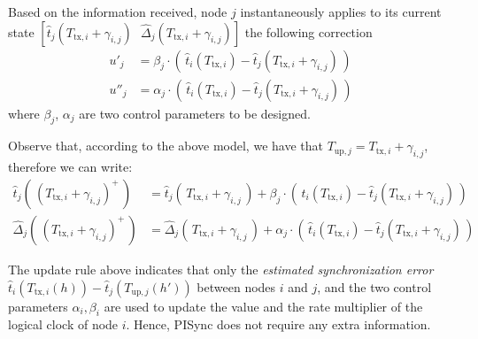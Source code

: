 \documentclass[english,a4paper,10pt,final]{article}
\numberwithin{equation}{section}
\numberwithin{figure}{section}
\begin{document}
Based on the information received, node $j$ instantaneously applies to its current state $[\hat{t}_j(T_{\mathrm{tx},i}+\gamma_{i,j})\,\,\,\,  \hat{\Delta}_j(T_{\mathrm{tx},i}+\gamma_{i,j})]$ the following correction
\begin{align}\label{eq:control-u}
u'_j &=   \beta_j \cdot \left(\, \hat{t}_i(T_{\mathrm{tx},i})-\hat{t}_j \left(T_{\mathrm{tx},i}+\gamma_{i,j}\right)\,\right)\nonumber\\
u''_j &=   \alpha_j \cdot \left(\, \hat{t}_i(T_{\mathrm{tx},i})-\hat{t}_j \left(T_{\mathrm{tx},i}+\gamma_{i,j}\right)\,\right)
\end{align}
where $\beta_j$, $\alpha_j$ are two control parameters to be designed.

Observe that, according to the above model, we have that $T_{\mathrm{up},j}=T_{\mathrm{tx},i}+\gamma_{i,j}$, therefore we can write:
\begin{align}
  \label{eq:Update_i1}
  \hat{t}_j\left(\,\left(T_{\mathrm{tx},i}+\gamma_{i,j}\right)^+\,\right) &= \hat{t}_j\left(\,T_{\mathrm{tx},i}+\gamma_{i,j}\,\right)+ \beta_j \cdot \left(\, \hat{t}_i(T_{\mathrm{tx},i})-\hat{t}_j \left(T_{\mathrm{tx},i}+\gamma_{i,j}\right)\,\right)\nonumber\\
\hat{\Delta}_j\left(\,\left(T_{\mathrm{tx},i}+\gamma_{i,j}\right)^+\,\right) & = \hat{\Delta}_j\left(\,T_{\mathrm{tx},i}+\gamma_{i,j}\,\right) +  \alpha_j \cdot \left(\, \hat{t}_i(T_{\mathrm{tx},i})-\hat{t}_j \left(T_{\mathrm{tx},i}+\gamma_{i,j}\right)\,\right)
\end{align}

The update rule above indicates that only the \textit{estimated synchronization error} $ \hat{t}_i(T_{\mathrm{tx},i}(h))-\hat{t}_j \left(T_{\mathrm{up},j}(h')\right)$ between nodes $i$ and $j$, and the two control parameters $\alpha_i,\beta_i$ are used to update the value and the rate multiplier of the logical clock of node $i$. Hence, PISync does not require any extra information.
\end{document}
